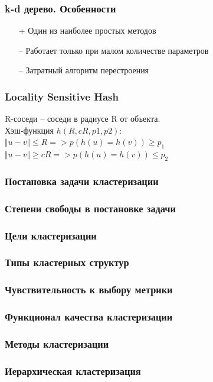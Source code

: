 \documentclass[12pt]{beamer}
\begin{document}
\begin{frame}\frametitle{k-d дерево. Особенности}
\begin{itemize}
\item[+] Один из наиболее простых методов
\item[--] Работает только при малом количестве параметров
\item[--] Затратный алгоритм перестроения

\end{itemize}
\end{frame}

\begin{frame}\frametitle{Locality Sensitive Hash}
R-соседи -- соседи в радиусе R от объекта.\\
\vspace{5mm}
Хэш-функция $h(R, cR, p1, p2)$:\\
$\Vert u - v \Vert  \leq R => p(h(u) = h(v)) \geq p_1$ \\
$\Vert u - v \Vert  \geq cR => p(h(u) = h(v)) \leq p_2$ 
\end{frame}

\begin{frame}\frametitle{Постановка задачи кластеризации}

\end{frame}

\begin{frame}\frametitle{Степени свободы в постановке задачи}
\end{frame}

\begin{frame}\frametitle{Цели кластеризации}
\end{frame}

\begin{frame}\frametitle{Типы кластерных структур}
\end{frame}

\begin{frame}\frametitle{Чувствительность к выбору метрики}
\end{frame}

\begin{frame}\frametitle{Функционал качества кластеризации}
\end{frame}

\begin{frame}\frametitle{Методы кластеризации}
\end{frame}

\begin{frame}\frametitle{Иерархическая кластеризация}
\end{frame}
\end{document}
